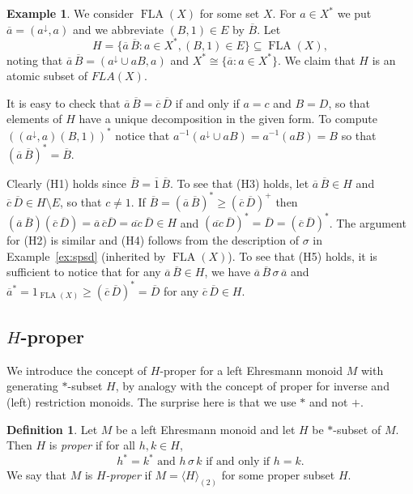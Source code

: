 \documentclass[12pt]{amsart}
\theoremstyle{definition}
\newtheorem{ex}[them]{Example}
\newtheorem{defn}[them]{Definition}
\theoremstyle{definition}
\numberwithin{them}{section}
\numberwithin{equation}{section}
\DeclareMathOperator{\FLA}{FLA}
\begin{document}
\begin{ex}\label{ex:frela}  We  consider $\FLA(X)$ for some set $X$. For $a\in X^*$ we put
$\overline{a}=(a^{\downarrow},a)$ and we abbreviate
$(B,1)\in E$ by $\overline{B}$. Let 
\[H=\{ \overline{a}\, \overline{B}: a\in X^*, (B,1)\in E\}\subseteq \FLA(X),\]
noting that $\overline{a}\, \overline{B}=(a^{\downarrow}\cup aB,a)$ and
$X^*\cong \{ \overline{a}:a\in X^*\}$.
We claim that $H$ is  an    atomic  subset of $FLA(X)$. 

  It is easy to check that $\overline{a}\, \overline{B}=\overline{c}\, \overline{D}$ 
if and only if $a=c$ and $B=D$, so that elements of $H$   have a unique decomposition in the given form.  To compute $((a^{\downarrow},a)(B,1))^*$ notice that  
$a^{-1}(a^{\downarrow}\cup aB)=a^{-1}(aB)=B$ so that $(\overline{a}\, \overline{B})^*=\overline{B}$. 

Clearly (H1) holds since
$\overline{B}=\overline{1}\, \overline{B}$. To see that (H3) holds, let $\overline{a}\, \overline{B}\in H$ and  $\overline{c}\, \overline{D} \in H\setminus E$,
so that $c\neq 1$. If $\overline{B} =(\overline{a}\, \overline{B})^*\geq (\overline{c}\, \overline{D})^+$
then $(\overline{a}\, \overline{B})(\overline{c}\, \overline{D})=\overline{a}\, \overline{c}\overline{D}=
\overline{ac}\, \overline{D}\in H$ and
$(\overline{ac}\, \overline{D})^*=\overline{D}=(\overline{c}\, \overline{D})^*$.
The argument for (H2) is similar and (H4) follows from the description of $\sigma$ in Example~\ref{ex:spsd} (inherited by $\FLA(X)$). To see that (H5) holds, it is sufficient to notice that for any 
$\overline{a}\, \overline{B}\in H$, we have
$\overline{a}\, \overline{B} \,\sigma\, \overline{a}$ and $\overline{a}^*=1_{\FLA(X)}\geq (\overline{c}\, \overline{D})^*=\overline{D}$ 
for any $\overline{c}\, \overline{D}\in H$. 
\end{ex}


\subsection{$H$-proper}\label{sub:proper}

 We introduce the concept of $H$-proper for a left Ehresmann monoid $M$ with generating $*$-subset $H$, by analogy with the concept of proper for inverse and (left) restriction monoids. The surprise here is that we use $*$ and not $+$.

\begin{defn}\label{defn:hproper} 
Let $M$ be a left Ehresmann monoid and  let $H$ be $*$-subset of $M$. Then $H$ is {\em proper} if for all  $h, k \in H$,  \[h^*=k^*\mbox{ and }h\,\sigma\, k\mbox{ if and only if }h=k.\]
We say that  $M$ 
is {\em $H$-proper} if $M=\langle H\rangle_{(2)}$ for some proper subset $H$.\end{defn}
\end{document}
